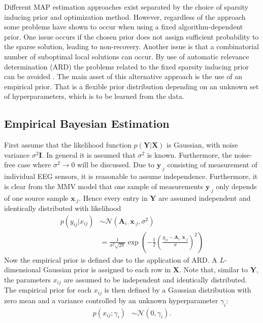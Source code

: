 Different MAP estimation approaches exist separated by the choice of sparsity inducing prior and optimization method. 
However, regardless of the approach some problems have shown to occur when using a fixed algorithm-dependent prior. 
One issue occurs if the chosen prior does not assign sufficient probability to the sparse solution, leading to non-recovery.
Another issue is that a combinatorial number of suboptimal local solutions can occur.
By use of automatic relevance determination (ARD) the problems related to the fixed sparsity inducing prior can be avoided \cite[p. 20]{phd_wipf}. 
The main asset of this alternative approach is the use of an empirical prior. 
That is a flexible prior distribution depending on an unknown set of hyperparameters, which is to be learned from the data.
 
\subsection{Empirical Bayesian Estimation}\label{seg:EBE}
First assume that the likelihood function $p(\mathbf{Y} \vert \mathbf{X})$ is Gaussian, with noise variance $\sigma^2\textbf{I}$. In general it is assumed that $\sigma^2$ is known. Furthermore, the noise-free case where $\sigma^2 \rightarrow 0$ will be discussed. 
Due to $\textbf{y}_{\cdot j}$ consisting of measurement of individual EEG sensors, it is reasonable to assume independence. Furthermore, it is clear from the MMV model that one sample of measurements $\textbf{y}_{\cdot j}$ only depends of one source sample $\textbf{x}_{\cdot j}$. Hence every entry in $\textbf{Y}$ are assumed independent and identically distributed with likelihood 
\begin{align*}
p(y_{ij}\vert x_{ij}) &\sim \mathcal{N}(\mathbf{A}_{i \cdot}\textbf{x}_{\cdot j}, \sigma^2) \\
& = \frac{1}{\sigma^2\sqrt{2\pi}}\exp\left( -\frac{1}{2}\left( \frac{y_{ij}- \mathbf{A}_{i \cdot}\textbf{x}_{\cdot j}}{\sigma}\right)^{2}\right)
\end{align*}
Now the empirical prior is defined due to the application of ARD. A $L$-dimensional Gaussian prior is assigned to each row in $\textbf{X}$. Note that, similar to $\textbf{Y}$, the parameters $x_{ij}$ are assumed to be independent and identically distributed.
The empirical prior for each $x_{ij}$ is then defined by a Gaussian distribution with zero mean and a variance controlled by an unknown hyperparameter $\gamma_i$:
\begin{align*}
p (x_{i j} ; \gamma_i) &\sim \mathcal{N}(0, \gamma_i).
\end{align*}
